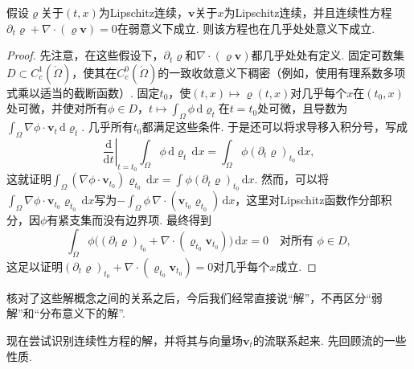 \begin{proposition}\label{obj:4.3}
假设$\varrho$关于$(t,x)$为Lipschitz连续，$\mathbf v$关于$x$为Lipschitz连续，并且连续性方程$\partial_t\varrho+\nabla\cdot(\varrho\mathbf v)=0$在弱意义下成立. 则该方程也在几乎处处意义下成立.
\end{proposition}
\begin{proof}
先注意，在这些假设下，$\partial_t\varrho$和$\nabla\cdot(\varrho\mathbf v)$都几乎处处有定义. 固定可数集$D\subset C_c^1(\mathring\Omega)$，使其在$C_c^0(\mathring\Omega)$的一致收敛意义下稠密（例如，使用有理系数多项式乘以适当的截断函数）. 固定$t_0$，使$(t,x)\mapsto\varrho(t,x)$对几乎每个$x$在$(t_0,x)$处可微，并使对所有$\phi\in D$，$t\mapsto\int_\Omega\phi\,\mathrm d\varrho_t$在$t=t_0$处可微，且导数为$\int_\Omega\nabla\phi\cdot\mathbf v_t\,\mathrm d\varrho_t$. 几乎所有$t_0$都满足这些条件. 于是还可以将求导移入积分号，写成
\[
 \left.\frac{\mathrm d}{\mathrm dt}\right|_{t=t_0}
       \int_\Omega\phi\,\mathrm d\varrho_t\,\mathrm dx
 =\int_\Omega\phi(\partial_t\varrho)_{t_0}\,\mathrm dx,
\]
这就证明$\int_\Omega(\nabla\phi\cdot\mathbf v_{t_0})\varrho_{t_0}\,\mathrm dx
=\int\phi(\partial_t\varrho)_{t_0}\,\mathrm dx$. 然而，可以将$\int_\Omega\nabla\phi\cdot\mathbf v_{t_0}\varrho_{t_0}\,\mathrm dx$写为$-\int_\Omega\phi\,\nabla\cdot(\mathbf v_{t_0}\varrho_{t_0})\,\mathrm dx$，这里对Lipschitz函数作分部积分，因$\phi$有紧支集而没有边界项. 最终得到
\[
 \int_\Omega\phi\bigl((\partial_t\varrho)_{t_0}
            +\nabla\cdot(\varrho_{t_0}\mathbf v_{t_0})\bigr)\,\mathrm dx=0
 \quad\text{对所有 }\phi\in D,
\]
这足以证明$(\partial_t\varrho)_{t_0}+\nabla\cdot(\varrho_{t_0}\mathbf v_{t_0})=0$对几乎每个$x$成立.
\end{proof}

核对了这些解概念之间的关系之后，今后我们经常直接说“解”，不再区分“弱解”和“分布意义下的解”.

现在尝试识别连续性方程的解，并将其与向量场$\mathbf v_t$的流联系起来. 先回顾流的一些性质.


